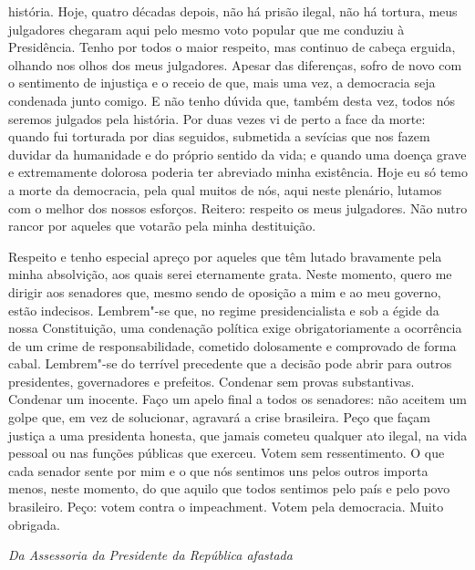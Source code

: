 história. Hoje, quatro décadas depois, não há prisão ilegal, não há
tortura, meus julgadores chegaram aqui pelo mesmo voto popular que me
conduziu à Presidência. Tenho por todos o maior respeito, mas continuo
de cabeça erguida, olhando nos olhos dos meus julgadores. Apesar das
diferenças, sofro de novo com o sentimento de injustiça e o receio de
que, mais uma vez, a democracia seja condenada junto comigo. E não tenho
dúvida que, também desta vez, todos nós seremos julgados pela história.
Por duas vezes vi de perto a face da morte: quando fui torturada por
dias seguidos, submetida a sevícias que nos fazem duvidar da humanidade
e do próprio sentido da vida; e quando uma doença grave e extremamente
dolorosa poderia ter abreviado minha existência. Hoje eu só temo a morte
da democracia, pela qual muitos de nós, aqui neste plenário, lutamos com
o melhor dos nossos esforços. Reitero: respeito os meus julgadores. Não
nutro rancor por aqueles que votarão pela minha destituição.

Respeito e tenho especial apreço por aqueles que têm lutado bravamente
pela minha absolvição, aos quais serei eternamente grata. Neste momento,
quero me dirigir aos senadores que, mesmo sendo de oposição a mim e ao
meu governo, estão indecisos. Lembrem"-se que, no regime presidencialista
e sob a égide da nossa Constituição, uma condenação política exige
obrigatoriamente a ocorrência de um crime de responsabilidade, cometido
dolosamente e comprovado de forma cabal. Lembrem"-se do terrível
precedente que a decisão pode abrir para outros presidentes,
governadores e prefeitos. Condenar sem provas substantivas. Condenar um
inocente. Faço um apelo final a todos os senadores: não aceitem um golpe
que, em vez de solucionar, agravará a crise brasileira. Peço que façam
justiça a uma presidenta honesta, que jamais cometeu qualquer ato
ilegal, na vida pessoal ou nas funções públicas que exerceu. Votem sem
ressentimento. O que cada senador sente por mim e o que nós sentimos uns
pelos outros importa menos, neste momento, do que aquilo que todos
sentimos pelo país e pelo povo brasileiro. Peço: votem contra o
impeachment. Votem pela democracia. Muito obrigada.

\emph{Da Assessoria da Presidente da República afastada}
